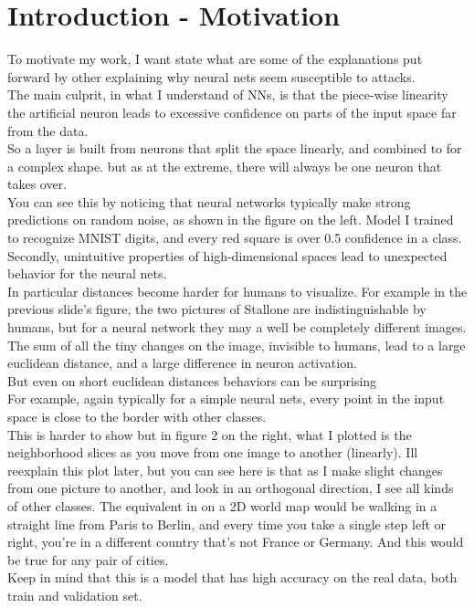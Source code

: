 \documentclass{article}
\begin{document}
\section{Introduction - Motivation}
To motivate my work, I want state what are some of the explanations put forward by other explaining why neural nets seem susceptible to attacks.\\
The main culprit, in what I understand of NNs, is that the piece-wise linearity the artificial neuron leads to excessive confidence on parts of the input space far from the data.\\
So a layer is built from neurons that split the space linearly, and combined to for a complex shape. but as at the extreme, there will always be one neuron that takes over.\\
You can see this by noticing that neural networks typically make strong predictions on random noise, as shown in the figure on the left. Model I trained to recognize MNIST digits, and every red square is over 0.5 confidence in a class.\\

Secondly, unintuitive properties of high-dimensional spaces lead to unexpected behavior for the neural nets.\\
In particular distances become harder for humans to visualize. For example in the previous slide's figure, the two pictures of Stallone are indistinguishable by humans, but for a neural network they may a well be completely different images. The sum of all the tiny changes on the image, invisible to humans, lead to a large euclidean distance, and a large difference in neuron activation.\\
But even on short euclidean distances behaviors can be surprising\\
For example, again typically for a simple neural nets, every point in the input space is close to the border with other classes.\\
This is harder to show but in figure 2 on the right, what I plotted is the neighborhood slices as you move from one image to another (linearly). Ill reexplain this plot later, but you can see here is that as I make slight changes from one picture to another, and look in an orthogonal direction, I see all kinds of other classes. The equivalent in on a 2D world map would be walking in a straight line from Paris to Berlin, and every time you take a single step left or right, you're in a different country that's not France or Germany. And this would be true for any pair of cities.\\
Keep in mind that this is a model that has high accuracy on the real data, both train and validation set.\\
\end{document}
